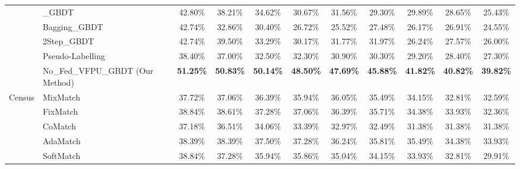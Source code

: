 \begin{table}
\begin{tabular}{llccccccccc}
							 & \_GBDT                           & 42.80\%          & 38.21\%          & 34.62\%          & 30.67\%          & 31.56\%          & 29.30\%          & 29.89\%          & 28.65\%          & 25.43\%           \\
							 & Bagging\_GBDT                    & 42.74\%          & 32.86\%          & 30.40\%          & 26.72\%          & 25.52\%          & 27.48\%          & 26.17\%          & 26.91\%          & 24.55\%           \\
							 & 2Step\_GBDT                      & 42.74\%          & 39.50\%          & 33.29\%          & 30.17\%          & 31.77\%          & 31.97\%          & 26.24\%          & 27.57\%          & 26.00\%           \\
							 & Pseudo-Labelling                 & 38.40\%          & 37.00\%          & 32.50\%          & 32.30\%          & 30.90\%          & 30.30\%          & 29.20\%          & 28.40\%          & 27.30\%           \\
							 & No\_Fed\_VFPU\_GBDT (Our Method) & \textbf{51.25\%} & \textbf{50.83\%} & \textbf{50.14\%} & \textbf{48.50\%} & \textbf{47.69\%} & \textbf{45.88\%} & \textbf{41.82\%} & \textbf{40.82\%} & \textbf{39.82\%}  \\ 
	\hline
	\multirow{10}{*}{Census} & MixMatch                         & 37.72\%          & 37.06\%          & 36.39\%          & 35.94\%          & 36.05\%          & 35.49\%          & 34.15\%          & 32.81\%          & 32.59\%           \\
							 & FixMatch                         & 38.84\%          & 38.61\%          & 37.28\%          & 37.06\%          & 36.39\%          & 35.71\%          & 34.38\%          & 33.93\%          & 32.36\%           \\
							 & CoMatch                          & 37.18\%          & 36.51\%          & 34.06\%          & 33.39\%          & 32.97\%          & 32.49\%          & 31.38\%          & 31.38\%          & 31.38\%           \\
							 & AdaMatch                         & 38.39\%          & 38.39\%          & 37.50\%          & 37.28\%          & 36.24\%          & 35.81\%          & 35.49\%          & 34.38\%          & 33.93\%           \\
							 & SoftMatch                        & 38.84\%          & 37.28\%          & 35.94\%          & 35.86\%          & 35.04\%          & 34.15\%          & 33.93\%          & 32.81\%          & 29.91\%           \\

\end{tabular}
\end{table}
